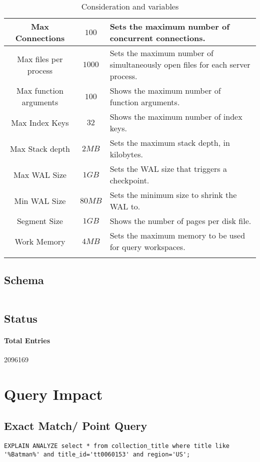 \documentclass[paper=letter, fontsize=12pt]{article}
\begin{document}
\begin{longtable}{c | c | p{9cm} }
		\\ \hline
		Max Connections & $100$ & Sets the maximum number of concurrent connections.
		\\ \hline
		Max files per process & $1000$ & Sets the maximum number of simultaneously open files for each server process.
		\\ \hline
		Max function arguments & $100$ & Shows the maximum number of function arguments.
		\\ \hline
		Max Index Keys & $32$ & Shows the maximum number of index keys.
		\\ \hline
		Max Stack depth & $2MB$ & Sets the maximum stack depth, in kilobytes.
		\\ \hline
		Max WAL Size & $1GB$ & Sets the WAL size that triggers a checkpoint.
		\\ \hline
		Min WAL Size & $80MB$ & Sets the minimum size to shrink the WAL to.
		\\ \hline
		Segment Size & $1GB$ & Shows the number of pages per disk file.
		\\ \hline
		Work Memory & $4MB$ & Sets the maximum memory to be used for query workspaces.
		\\ \hline
		
		\caption{Consideration and variables}
	\end{longtable}
\subsection{Schema}
\inputminted{sql}{schema_structure.sql}

\subsection{Status}
\paragraph{Total Entries} 2096169

\section{Query Impact}

\subsection{Exact Match/ Point Query}
\begin{verbatim}
EXPLAIN ANALYZE select * from collection_title where title like '%Batman%' and title_id='tt0060153' and region='US';
\end{verbatim}
\end{document}
